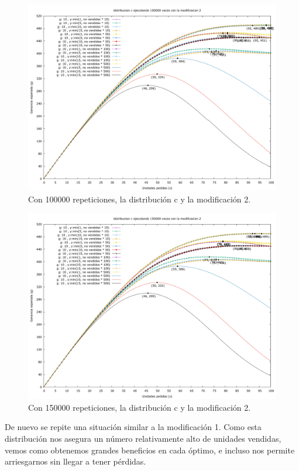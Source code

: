 \documentclass[12pt, spanish]{article}
\begin{document}
\begin{figure}[H]
	\centering
	\includegraphics[scale = 0.2]{prob_c/datos_c_100000_2.png}
	\caption{Con 100000 repeticiones, la distribución c y la modificación 2.}
	\label{fig:ej1_a_100000}

\end{figure}

\begin{figure}[H]
	\centering
	\includegraphics[scale = 0.2]{prob_c/datos_c_150000_2.png}
	\caption{Con 150000 repeticiones, la distribución c y la modificación 2.}
	\label{fig:ej1_a_150000}

\end{figure}

De nuevo se repite una situación similar a la modificación 1. Como esta distribución nos asegura un número relativamente alto de unidades vendidas, vemos como obtenemos grandes beneficios en cada óptimo, e incluso nos permite arriesgarnos sin llegar a tener pérdidas.
\end{document}
